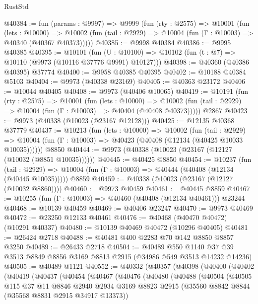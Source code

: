 \begin{lexlean}{RustStd}
\begin{coremodule}
@40384 := fun (params : @9997) =>
  @9999
    (fun (rty : @2575) =>
    @10001
      (fun (lets : @10000) =>
      @10002 (fun (tail : @2929) => @10004 (fun (Γ : @10003) => @40340 (@40367 @40373)))))
@40385 := @9998 @40384
@40386 := @9995 @40385
@40395 := @10101
    (fun (U : @10100) => @10102 (fun (t : @7) => @10110 (@9973 (@10116 @37776 @9991) @10127)))
@40398 := @40360 (@40386 @40395) @37774
@40400 := @9958 @40385 @40395
@40402 := @10188 @40384 @5103
@40404 := @9973 (@40338 @23169)
@40405 := @40363 @23172
@40406 := @10044 @40405
@40408 := @9973 (@40406 @10065)
@40419 := @10191
    (fun (rty : @2575) =>
    @10001
      (fun (lets : @10000) =>
      @10002 (fun (tail : @2929) => @10004 (fun (Γ : @10003) => @40404 (@40408 @40373)))))
    @2867
@40423 := @9973 (@40338 (@10023 (@23167 @12128)))
@40425 := @12135 @40368 @37779
@40437 := @10213
    (fun (lets : @10000) =>
    @10002
      (fun (tail : @2929) =>
      @10004 (fun (Γ : @10003) => @40423 (@40408 (@12134 (@40425 @10033 @10035))))))
    @8850
@40444 := @9973 (@40338 (@10023 (@23167 (@12127 (@10032 (@8851 @10035))))))
@40445 := @40425 @8850
@40454 := @10237
    (fun (tail : @2929) => @10004 (fun (Γ : @10003) => @40444 (@40408 (@12134 (@40445 @10035)))))
    @8859
@40459 := @40338 (@10023 (@23167 (@12127 (@10032 @8860))))
@40460 := @9973 @40459
@40461 := @40445 @8859
@40467 := @10255 (fun (Γ : @10003) => @40460 (@40408 (@12134 @40461))) @23244
@40468 := @10139 @40459
@40469 := @40406 @23247
@40470 := @9973 @40469
@40472 := @23250 @12133 @40461
@40476 := @40468 (@40470 @40472) (@10291 @40337)
@40480 := @10139 @40469 @40472 (@10296 @40405)
@40481 := @26424 @2718
@40488 := @40481 @400 @2283 @70 @142 @8850 @8857 @3250
@40489 := @26433 @2718
@40504 := @40489
    @550
    @1140
    @37
    @39
    @3513
    @8849
    @8856
    @3169
    @8813
    @2915
    (@34986 @549 @3513 @14232 @14236)
@40505 := @40489 @1121
@40552 := @40332
    (@40357
      (@40398
        (@40400
          (@40402
            (@40419
              (@40437
                (@40454
                  (@40467
                    (@40476
                      (@40480
                        (@40488
                          (@40504
                            (@40505
                              @115
                              @37
                              @11
                              @8846
                              @2940
                              @2934
                              @3169
                              @8823
                              @2915
                              (@35560 @8842 @8844 (@35568 @8831 @2915 @34917 @13373))

\end{coremodule}
\end{lexlean}
